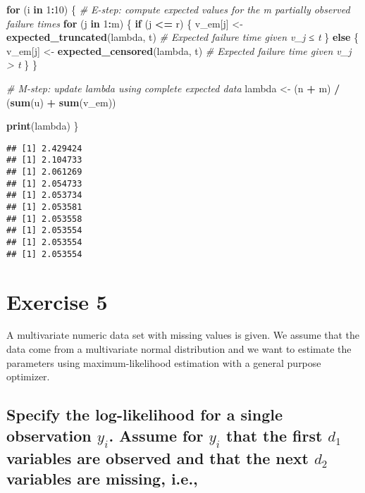 \documentclass[
]{article}
\newenvironment{Shaded}{\begin{snugshade}}{\end{snugshade}}
\newcommand{\CommentTok}[1]{\textcolor[rgb]{0.56,0.35,0.01}{\textit{#1}}}
\newcommand{\ControlFlowTok}[1]{\textcolor[rgb]{0.13,0.29,0.53}{\textbf{#1}}}
\newcommand{\DecValTok}[1]{\textcolor[rgb]{0.00,0.00,0.81}{#1}}
\newcommand{\FunctionTok}[1]{\textcolor[rgb]{0.13,0.29,0.53}{\textbf{#1}}}
\newcommand{\NormalTok}[1]{#1}
\newcommand{\OtherTok}[1]{\textcolor[rgb]{0.56,0.35,0.01}{#1}}
\newcommand{\SpecialCharTok}[1]{\textcolor[rgb]{0.81,0.36,0.00}{\textbf{#1}}}
\begin{document}
\begin{Shaded}
\begin{Highlighting}[]
\ControlFlowTok{for}\NormalTok{ (i }\ControlFlowTok{in} \DecValTok{1}\SpecialCharTok{:}\DecValTok{10}\NormalTok{) \{}
  \CommentTok{\# E{-}step: compute expected values for the m partially observed failure times}
  \ControlFlowTok{for}\NormalTok{ (j }\ControlFlowTok{in} \DecValTok{1}\SpecialCharTok{:}\NormalTok{m) \{}
    \ControlFlowTok{if}\NormalTok{ (j }\SpecialCharTok{\textless{}=}\NormalTok{ r) \{}
\NormalTok{      v\_em[j] }\OtherTok{\textless{}{-}} \FunctionTok{expected\_truncated}\NormalTok{(lambda, t)  }\CommentTok{\# Expected failure time given v\_j ≤ t}
\NormalTok{    \} }\ControlFlowTok{else}\NormalTok{ \{}
\NormalTok{      v\_em[j] }\OtherTok{\textless{}{-}} \FunctionTok{expected\_censored}\NormalTok{(lambda, t)   }\CommentTok{\# Expected failure time given v\_j \textgreater{} t}
\NormalTok{    \}}
\NormalTok{  \}}

  \CommentTok{\# M{-}step: update lambda using complete expected data}
\NormalTok{  lambda }\OtherTok{\textless{}{-}}\NormalTok{ (n }\SpecialCharTok{+}\NormalTok{ m) }\SpecialCharTok{/}\NormalTok{ (}\FunctionTok{sum}\NormalTok{(u) }\SpecialCharTok{+} \FunctionTok{sum}\NormalTok{(v\_em))}

  \FunctionTok{print}\NormalTok{(lambda)}
\NormalTok{\}}
\end{Highlighting}
\end{Shaded}

\begin{verbatim}
## [1] 2.429424
## [1] 2.104733
## [1] 2.061269
## [1] 2.054733
## [1] 2.053734
## [1] 2.053581
## [1] 2.053558
## [1] 2.053554
## [1] 2.053554
## [1] 2.053554
\end{verbatim}

\section{Exercise 5}\label{exercise-5}

A multivariate numeric data set with missing values is given. We assume
that the data come from a multivariate normal distribution and we want
to estimate the parameters using maximum-likelihood estimation with a
general purpose optimizer.

\subsection{\texorpdfstring{Specify the log-likelihood for a single
observation \(y_{i}\). Assume for \(y_{i}\) that the first \(d_{1}\)
variables are observed and that the next \(d_{2}\) variables are
missing,
i.e.,}{Specify the log-likelihood for a single observation y\_\{i\}. Assume for y\_\{i\} that the first d\_\{1\} variables are observed and that the next d\_\{2\} variables are missing, i.e.,}}\label{specify-the-log-likelihood-for-a-single-observation-y_i.-assume-for-y_i-that-the-first-d_1-variables-are-observed-and-that-the-next-d_2-variables-are-missing-i.e.}
\end{document}
